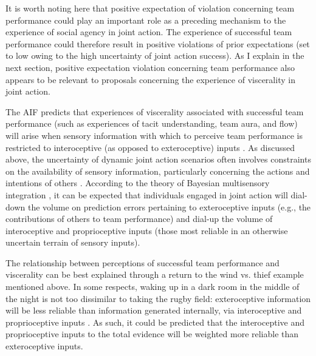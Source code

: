 \begin{CJK}{UTF8}{gbsn}
It is worth noting here that positive expectation of violation concerning team performance could play an important role as a preceding mechanism to the experience of social agency in joint action. The experience of successful team performance could therefore result in positive violations of prior expectations (set to low owing to the high uncertainty of joint action success).  As I explain in the next section, positive expectation violation concerning team performance also appears to be relevant to proposals concerning the experience of viscerality in joint action.


The AIF predicts that experiences of viscerality associated with successful team performance (such as experiences of tacit understanding, team aura, and flow) will arise when sensory information with which to perceive team performance is restricted to interoceptive (as opposed to exteroceptive) inputs \citep{Pezzulo2014}.  As discussed above, the uncertainty of dynamic joint action scenarios often involves constraints on the availability of sensory information, particularly concerning the actions and intentions of others \citep{Wolpert2003}.  According to the theory of Bayesian multisensory integration \citep{Ernst2004}, it can be expected that individuals engaged in joint action will dial-down the volume on prediction errors pertaining to exteroceptive inputs (e.g., the contributions of others to team performance) and dial-up the volume of interoceptive and proprioceptive inputs (those most reliable in an otherwise uncertain terrain of sensory inputs).


The relationship between perceptions of successful team performance and viscerality can be best explained through a return to the wind vs. thief example mentioned above.  In some respects, waking up in a dark room in the middle of the night is not too dissimilar to taking the rugby field: exteroceptive information will be less reliable than information generated internally, via interoceptive and proprioceptive inputs \citep{Pezzulo2014}. As such, it could be predicted that the interoceptive and proprioceptive inputs to the total evidence will be weighted more reliable than exteroceptive inputs.


\end{CJK}
